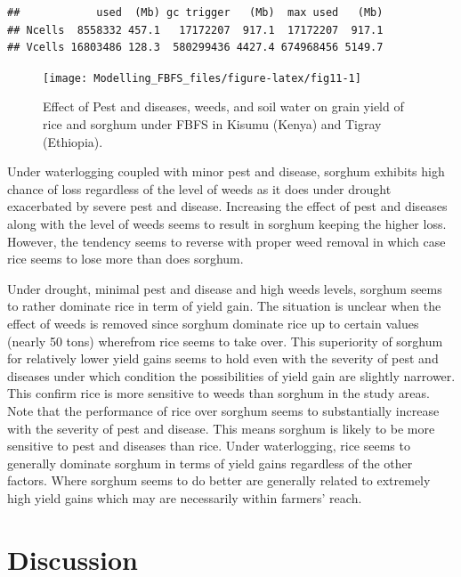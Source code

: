 \documentclass[12pt,oneside]{article}
\begin{document}
\begin{verbatim}
##            used  (Mb) gc trigger   (Mb)  max used   (Mb)
## Ncells  8558332 457.1   17172207  917.1  17172207  917.1
## Vcells 16803486 128.3  580299436 4427.4 674968456 5149.7
\end{verbatim}

\begin{figure}[!htbp]

{\centering \texttt{[image: Modelling\_FBFS\_files/figure-latex/fig11-1]} 

}

\caption{Effect of Pest and diseases, weeds, and soil water on grain yield of rice and sorghum under FBFS in Kisumu (Kenya) and Tigray (Ethiopia).}\label{fig:fig11}
\end{figure}

Under waterlogging coupled with minor pest and disease, sorghum exhibits high chance of loss regardless of the level of weeds as it does under drought exacerbated by severe pest and disease. Increasing the effect of pest and diseases along with the level of weeds seems to result in sorghum keeping the higher loss. However, the tendency seems to reverse with proper weed removal in which case rice seems to lose more than does sorghum.

Under drought, minimal pest and disease and high weeds levels, sorghum seems to rather dominate rice in term of yield gain. The situation is unclear when the effect of weeds is removed since sorghum dominate rice up to certain values (nearly 50 tons) wherefrom rice seems to take over. This superiority of sorghum for relatively lower yield gains seems to hold even with the severity of pest and diseases under which condition the possibilities of yield gain are slightly narrower. This confirm rice is more sensitive to weeds than sorghum in the study areas. Note that the performance of rice over sorghum seems to substantially increase with the severity of pest and disease. This means sorghum is likely to be more sensitive to pest and diseases than rice.
Under waterlogging, rice seems to generally dominate sorghum in terms of yield gains regardless of the other factors. Where sorghum seems to do better are generally related to extremely high yield gains which may are necessarily within farmers' reach.

\hypertarget{V}{%
\section{Discussion}\label{V}}
\end{document}
